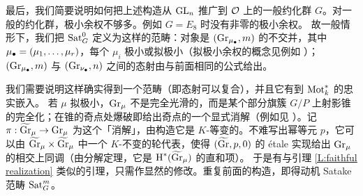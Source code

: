最后，我们简要说明如何把上述构造从 ${\operatorname{GL}}_n$ 推广到 ${\mathcal O}$ 上的一般约化群 $G$。对一般的约化群，极小余权不够多。例如 $G=E_8$ 时没有非零的极小余权。
故一般情形下，我们把 $\operatorname{Sat}^0_G$ 定义为这样的范畴：对象是 $({\operatorname{Gr}}_{{\mu_\bullet}},m)$ 的不交并，其中 ${\mu_\bullet}=(\mu_1,\ldots,\mu_r)$，每个 $\mu_i$ 极小或拟极小（拟极小余权的概念见例如 \cite[\S 2.2.2]{Zh1}）；$({\operatorname{Gr}}_{{\mu_\bullet}},m)$ 与 $({\operatorname{Gr}}_{{\nu_\bullet}},n)$ 之间的态射由与前面相同的公式给出。

我们需要说明这样确实得到一个范畴（即态射可以复合），并且它有到 $\operatorname{Mot}_k^*$ 的忠实嵌入。
若 $\mu$ 拟极小，${\operatorname{Gr}}_\mu$ 不是完全光滑的，而是某个部分旗簇 $G/P$ 上射影锥的完全化；在锥的奇点处爆破即给出奇点的一个显式消解（例如见 \cite[引理 2.12]{Zh1}）。记 $\pi:{\widetilde{{\operatorname{Gr}}}}_\mu\to {\operatorname{Gr}}_\mu$ 为这个「消解」，由构造它是 $K$-等变的。不难写出幂等元 $p$，它可以由 ${\widetilde{{\operatorname{Gr}}}}_\mu\times{\widetilde{{\operatorname{Gr}}}}_\mu$ 中一个 $K$-不变的轮代表，使得 $({\widetilde{{\operatorname{Gr}}}},p,0)$ 的 étale 实现给出 ${\operatorname{Gr}}_\mu$ 的相交上同调（由分解定理，它是 $\operatorname{H}^*({\widetilde{{\operatorname{Gr}}}}_\mu)$ 的直和项）。
于是有与引理 \ref{L:faithful realization} 类似的引理，只需作显然的修改。重复前面的构造，即得动机 Satake 范畴 $\operatorname{Sat}^m_G$。
